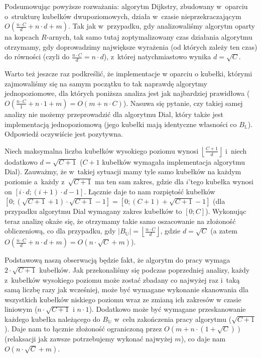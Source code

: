 Podsumowując powyższe rozważania: algorytm Dijkstry, zbudowany w~oparciu o~strukturę kubełków dwupoziomowych, działa w~czasie nieprzekraczającym $O \left( \frac{n \cdot C}{d} + n \cdot d + m \right)$.
Tak jak w~przypadku, gdy analizowaliśmy algorytm oparty na kopcach $R$-arnych, tak samo tutaj zoptymalizowany czas działania algorytmu otrzymamy, gdy doprowadzimy największe wyrażenia (od których zależy ten czas) do równości (czyli do $\frac{n \cdot C}{d} = n \cdot d$), z~której natychmiastowo wynika $d = \sqrt{C}$.

Warto też jeszcze raz podkreślić, że implementacje w oparciu o kubełki, którymi zajmowaliśmy się na samym początku to tak naprawdę algorytmy jednopoziomowe, dla których poniższa analiza jest jak najbardziej prawidłowa ($ O \left( \frac{n \cdot C}{1} + n \cdot 1 + m \right) = O \left( m + n \cdot C \right)$).
Nasuwa się pytanie, czy takiej samej analizy nie możemy przeprowadzić dla algorytmu Dial, który także jest implementacją jednopoziomową (jego kubełki mają identyczne własności co $B_{\mathbb{L}}$).
Odpowiedź oczywiście jest pozytywna.

Niech maksymalna liczba kubełków wysokiego poziomu wynosi $\left \lfloor \frac{C+1}{d} \right \rfloor$ i~niech dodatkowo $d = \sqrt{C + 1}$ ($C+1$ kubełków wymagała implementacja algorytmu Dial).
Zauważmy, że w~takiej sytuacji mamy tyle samo kubełków na każdym poziomie a~każdy z~$\sqrt{C + 1}$ ma ten sam zakres, gdzie dla $i$'tego kubełka wynosi on $\left[ i \cdot d ; \left( i+1 \right) \cdot d - 1\right]$.
Łącznie daje to nam rozpiętość kubełków $\left[ 0 ; \left( \sqrt{C + 1} +1 \right) \cdot \sqrt {C + 1} - 1\right] = \left[ 0 ; \left( C + 1 \right) + \sqrt{C + 1} - 1 \right]$ (dla przypadku algorytmu Dial wymagany zakres kubełków to $\left[ 0 ; C \right]$).
Wykonując teraz analizę okaże się, że otrzymamy takie samo oszacowanie na złożoność obliczeniową, co dla przypadku, gdy $\left| B_{\mathbb{U}} \right| = \left \lfloor \frac{n \cdot C}{d} \right \rfloor$, gdzie $d = \sqrt{C}$ (a zatem $O \left( \frac{n \cdot C}{d} + n \cdot d + m \right) =  O \left( n \cdot \sqrt{C} + m \right)$).

Podstawową naszą obserwacją będzie fakt, że algorytm do pracy wymaga $2 \cdot \sqrt{C+1}$ kubełków.
Jak przekonaliśmy się podczas poprzedniej analizy, każdy z~kubełków wysokiego poziomu może zostać zbadany co najwyżej raz i~taką samą liczbę razy jak wcześniej, może być wymagane wykonanie skanowania dla wszystkich kubełków niskiego poziomu wraz ze zmianą ich zakresów w czasie liniowym ($n \cdot \sqrt{C+1}$ i $n \cdot 1$).
Dodatkowo może być wymagane przeskanowanie każdego kubełka należącego do $B_{\mathbb{U}}$ w~celu zakończenia pracy algorytmu ($ \sqrt{C+1}$).
Daje nam to łącznie złożoność ograniczoną przez $O \left( m + n \cdot \left( 1 + \sqrt{C} \right) \right)$ (relaksacji jak zawsze potrzebujemy wykonać najwyżej $m$), co daje nam $O\left( n \cdot \sqrt{C} + m \right)$.


